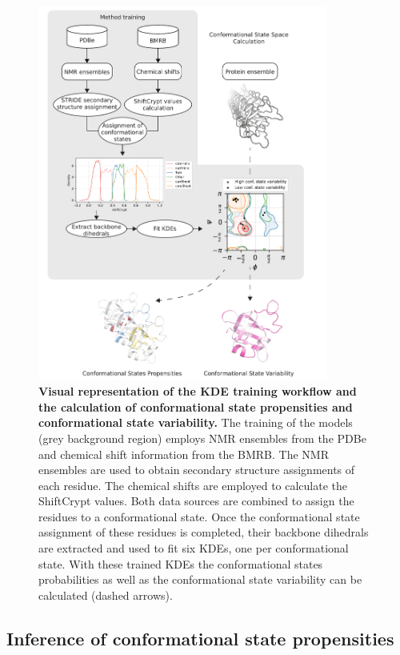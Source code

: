 \begin{figure}[H]
    \centering
    \includegraphics[width=0.85\textwidth]{constava/figures_constava/figure1.pdf}
    \caption{\textbf{Visual representation of the KDE training workflow and the calculation of conformational state propensities and conformational state variability.} 
        The training of the models (grey background region) employs NMR ensembles from the PDBe and chemical shift information from the BMRB. The NMR ensembles are used to obtain secondary structure assignments of each residue. The chemical shifts are employed to calculate the ShiftCrypt values. Both data sources are combined to assign the residues to a conformational state. Once the conformational state assignment of these residues is completed, their backbone dihedrals are extracted and used to fit six KDEs, one per conformational state. With these trained KDEs the conformational states probabilities as well as the conformational state variability can be calculated (dashed arrows). }
    \label{overal_figure}
\end{figure}

\subsection{Inference of conformational state propensities} \label{inference_conf_states}


